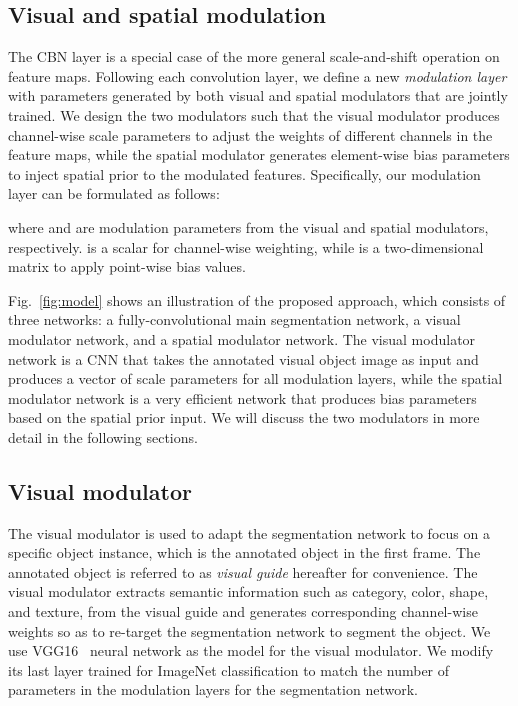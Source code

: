 \documentclass[10pt,twocolumn,letterpaper]{article}
\begin{document}
\subsection{Visual and spatial modulation}

The CBN layer is a special case of the more general scale-and-shift operation on feature maps. Following each convolution layer, we define a new \textit{modulation layer} with parameters generated by both visual and spatial modulators that are jointly trained. We design the two modulators such that the visual modulator produces channel-wise scale parameters to adjust the weights of different channels in the feature maps, while the spatial modulator generates element-wise bias parameters to inject spatial prior to the modulated features. Specifically, our modulation layer can be formulated as follows:

where  and  are modulation parameters from the visual and spatial modulators, respectively.  is a scalar for channel-wise weighting, while  is a two-dimensional matrix to apply point-wise bias values. 



Fig.~\ref{fig:model} shows an illustration of the proposed approach, which consists of three networks: a fully-convolutional main segmentation network, a visual modulator network, and a spatial modulator network. The visual modulator network is a CNN that takes the annotated visual object image as input and produces a vector of scale parameters for all modulation layers, while the spatial modulator network is a very efficient network that produces bias parameters based on the spatial prior input. We will discuss the two modulators in more detail in the following sections.

\subsection{Visual modulator}

The visual modulator is used to adapt the segmentation network to focus on a specific object instance, which is the annotated object in the first frame. The annotated object is referred to as \emph{visual guide} hereafter for convenience. The visual modulator extracts semantic information such as category, color, shape, and texture, from the visual guide and generates corresponding channel-wise weights so as to re-target the segmentation network to segment the object. We use VGG16~\cite{simonyan2014very} neural network as the model for the visual modulator. We modify its last layer trained for ImageNet classification to match the number of parameters in the modulation layers for the segmentation network. 
\end{document}
